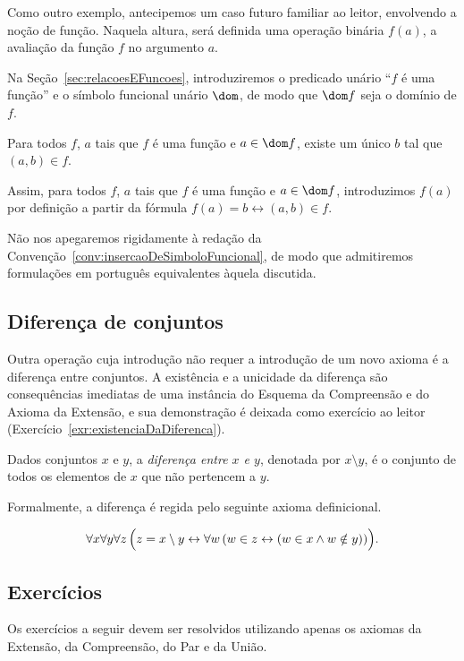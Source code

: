 \begin{example}[$\BST$]
    Como outro exemplo, antecipemos um caso futuro familiar ao leitor, envolvendo a noção de função.
    Naquela altura, será definida uma operação binária $f(a)$, a avaliação da função $f$ no argumento $a$.
    
    Na Seção~\ref{sec:relacoesEFuncoes}, introduziremos o predicado unário ``$f$ é uma função'' e o símbolo funcional unário $\dom$, de modo que $\dom f$ seja o domínio de $f$.

    Para todos $f$, $a$ tais que $f$ é uma função e $a \in \dom f$, existe um único $b$ tal que $(a, b) \in f$.

    Assim, para todos $f$, $a$ tais que $f$ é uma função e $a \in \dom f$, introduzimos $f(a)$ por definição a partir da fórmula $f(a) = b \leftrightarrow (a, b) \in f$.
\end{example}

Não nos apegaremos rigidamente à redação da Convenção~\ref{conv:insercaoDeSimboloFuncional}, de modo que admitiremos formulações em português equivalentes àquela discutida.

\subsection{Diferença de conjuntos}\label{subsec:diferencaDeConjuntos}
Outra operação cuja introdução não requer a introdução de um novo axioma é a diferença entre conjuntos.
A existência e a unicidade da diferença são consequências imediatas de uma instância do Esquema da Compreensão e do Axioma da Extensão, e sua demonstração é deixada como exercício ao leitor (Exercício~\ref{exr:existenciaDaDiferenca}).
\begin{definition}[$\BST$]\label{def:diferencaDeConjuntos}
    Dados conjuntos $x$ e $y$, a \emph{diferença entre $x$ e $y$}, denotada por $x\setminus y$, é o conjunto de todos os elementos de $x$ que não pertencem a $y$.

    Formalmente, a diferença é regida pelo seguinte axioma definicional.

    \[
        \forall x \forall y \forall z\, \Bigl(z = x \setminus y \leftrightarrow \forall w\, (w \in z \leftrightarrow (w \in x \land w \notin y))\Bigr).
    \]
\end{definition}
\subsection*{Exercícios}
Os exercícios a seguir devem ser resolvidos utilizando apenas os axiomas da Extensão, da Compreensão, do Par e da União.

